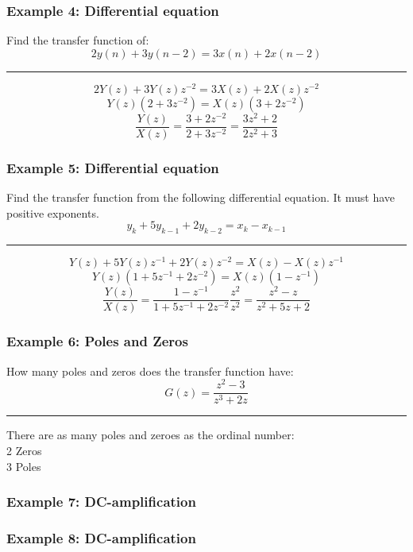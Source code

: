 \subsubsection{Example 4: Differential equation}
Find the transfer function of:
$$2y(n)+3y(n-2)=3x(n)+2x(n-2)$$

\rule{\textwidth}{0.5pt}

$$2Y(z)+3Y(z)z^{-2}=3X(z)+2X(z)z^{-2}$$
$$Y(z)(2+3z^{-2})=X(z)(3+2z^{-2})$$
$$\frac{Y(z)}{X(z)}=\frac{3+2z^{-2}}{2+3z^{-2}}=\frac{3z^2+2}{2z^2+3}$$
\subsubsection{Example 5: Differential equation}
Find the transfer function from the following differential equation. It must have positive exponents.
$$y_k+5y_{k-1}+2y_{k-2}=x_k-x_{k-1}$$

\rule{\textwidth}{0.5pt}

$$Y(z)+5Y(z)z^{-1}+2Y(z)z^{-2}=X(z)-X(z)z^{-1}$$
$$Y(z)(1+5z^{-1}+2z^{-2})=X(z)(1-z^{-1})$$
$$\frac{Y(z)}{X(z)}=\frac{1-z^{-1}}{1+5z^{-1}+2z^{-2}}\frac{z^2}{z^2}=\frac{z^2-z}{z^2+5z+2}$$

\subsubsection{Example 6: Poles and Zeros}
How many poles and zeros does the transfer function have:
$$G(z)=\frac{z^2-3}{z^3+2z}$$

\rule{\textwidth}{0.5pt}

There are as many poles and zeroes as the ordinal number:\\
2 Zeros\\
3 Poles

\subsubsection{Example 7: DC-amplification}
\subsubsection{Example 8: DC-amplification}
